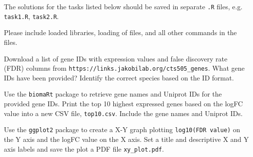 \documentclass[11pt,largemargins, letter]{homework}
\begin{document}
\maketitle

The solutions for the tasks listed below should be saved in separate \texttt{.R} files, e.g. \texttt{task1.R}, \texttt{task2.R}.

Please include loaded libraries, loading of files, and all other commands in the files.

\question

  \begin{alphaparts}
    \questionpart Download a list of gene IDs with expression values and false discovery rate (FDR) columns from \texttt{https://links.jakobilab.org/cts505\_genes}.
    \questionpart What gene IDs have been provided?
    Identify the correct species based on the ID format.
  \end{alphaparts}


\question

  \begin{alphaparts}
    \questionpart Use the \texttt{biomaRt} package to retrieve gene names and Uniprot IDs for the provided gene IDs.
    \questionpart Print the top 10 highest expressed genes based on the logFC value into a new CSV file, \texttt{top10.csv}.
    Include the gene names and Uniprot IDs.
  \end{alphaparts}

\question

  \begin{alphaparts}
    \questionpart Use the \texttt{ggplot2} package to create a X-Y graph plotting \texttt{log10(FDR value)} on the Y axis and the logFC value on the X axis.
    \questionpart Set a title and descriptive X and Y axis labels and save the plot a PDF file \texttt{xy\_plot.pdf}.
  \end{alphaparts}
\end{document}
